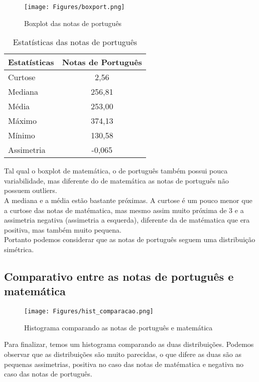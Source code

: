 \documentclass[
	12pt,				%
	openright,			%
	twoside,			%
	a4paper,			%
	english,			%
	french,				%
	spanish,			%
	brazil,				%
	]{abntex2}
\begin{document}
\clearpage
 \begin{figure}[h!]
    \centering
    \texttt{[image: Figures/boxport.png]}
    \caption{Boxplot das notas de português}
    \label{fig:exemplo}
\end{figure}
\begin{table}[h!]
   \centering
   \caption{Estatísticas das notas de português}
\begin{tabular}{|l|c|}
\hline
Estatísticas & \multicolumn{1}{l|}{Notas de Português} \\ \hline
Curtose      & 2,56                                    \\ \hline
Mediana      & 256,81                                  \\ \hline
Média        & 253,00                                  \\ \hline
Máximo       & 374,13                                  \\ \hline
Mínimo       & 130,58                                  \\ \hline
Assimetria   & -0,065                                  \\ \hline
\end{tabular}
\end{table}
Tal qual o boxplot de matemática, o de português também possui pouca variabilidade,
mas diferente do de matemática as notas de português não possuem outliers. \\
A mediana e a média estão bastante próximas.
A curtose é um pouco menor que a curtose das notas de matématica, mas mesmo assim muito
próxima de 3 e a assimetria negativa (assimetria a esquerda), diferente da de matématica que era positiva, 
mas também muito pequena. \\
Portanto podemos considerar que as notas de português seguem
uma distribuição simétrica.
\clearpage

\subsection{Comparativo entre as notas de português e matemática}
 \begin{figure}[h!]
    \centering
    \texttt{[image: Figures/hist\_comparacao.png]}
    \caption{Histograma comparando as notas de português e matemática}
    \label{fig:exemplo}
\end{figure}
Para finalizar, temos um histograma comparando as duas distribuições. Podemos observar
que as distribuições são muito parecidas, o que difere as duas são as pequenas assimetrias,
positiva no caso das notas de matématica e negativa no caso das notas de português.
\clearpage
\end{document}
